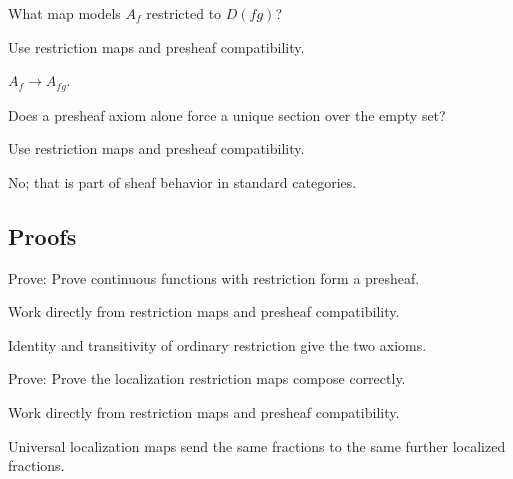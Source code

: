 \begin{exercise}\label{exr:vi12-expand-04}
What map models $A_f$ restricted to $D(fg)$?
\end{exercise}
\begin{hint}
Use restriction maps and presheaf compatibility.
\end{hint}
\begin{solution}
$A_f\to A_{fg}$.
\end{solution}

\begin{exercise}\label{exr:vi12-expand-05}
Does a presheaf axiom alone force a unique section over the empty set?
\end{exercise}
\begin{hint}
Use restriction maps and presheaf compatibility.
\end{hint}
\begin{solution}
No; that is part of sheaf behavior in standard categories.
\end{solution}

\subsection*{Proofs}

\begin{exercise}\label{exr:vi12-expand-06}
Prove: Prove continuous functions with restriction form a presheaf.
\end{exercise}
\begin{hint}
Work directly from restriction maps and presheaf compatibility.
\end{hint}
\begin{solution}
Identity and transitivity of ordinary restriction give the two axioms.
\end{solution}

\begin{exercise}\label{exr:vi12-expand-07}
Prove: Prove the localization restriction maps compose correctly.
\end{exercise}
\begin{hint}
Work directly from restriction maps and presheaf compatibility.
\end{hint}
\begin{solution}
Universal localization maps send the same fractions to the same further localized fractions.
\end{solution}

